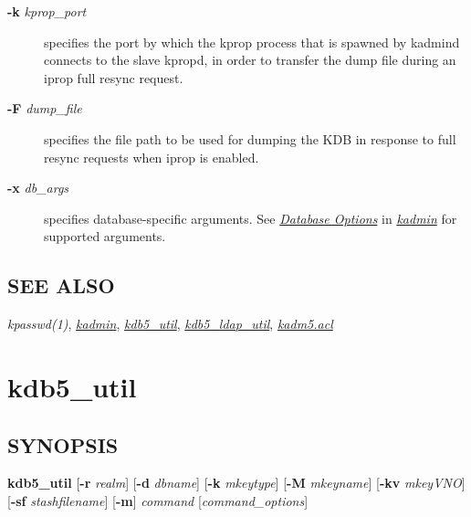 \documentclass[letterpaper,10pt,english]{sphinxmanual}
\begin{document}
\begin{description}
\item[{\textbf{-k} \emph{kprop\_port}}] \leavevmode
specifies the port by which the kprop process that is spawned by kadmind
connects to the slave kpropd, in order to transfer the dump file during
an iprop full resync request.

\item[{\textbf{-F} \emph{dump\_file}}] \leavevmode
specifies the file path to be used for dumping the KDB in response
to full resync requests when iprop is enabled.

\item[{\textbf{-x} \emph{db\_args}}] \leavevmode
specifies database-specific arguments.  See {\hyperref[admin/admin_commands/kadmin_local:dboptions]{\emph{Database Options}}} in {\hyperref[admin/admin_commands/kadmin_local:kadmin-1]{\emph{kadmin}}} for supported arguments.

\end{description}


\subsection{SEE ALSO}
\label{admin/admin_commands/kadmind:see-also}
\emph{kpasswd(1)}, {\hyperref[admin/admin_commands/kadmin_local:kadmin-1]{\emph{kadmin}}}, {\hyperref[admin/admin_commands/kdb5_util:kdb5-util-8]{\emph{kdb5\_util}}},
{\hyperref[admin/admin_commands/kdb5_ldap_util:kdb5-ldap-util-8]{\emph{kdb5\_ldap\_util}}}, {\hyperref[admin/conf_files/kadm5_acl:kadm5-acl-5]{\emph{kadm5.acl}}}


\section{kdb5\_util}
\label{admin/admin_commands/kdb5_util:kdb5-util-8}\label{admin/admin_commands/kdb5_util::doc}\label{admin/admin_commands/kdb5_util:kdb5-util}

\subsection{SYNOPSIS}
\label{admin/admin_commands/kdb5_util:synopsis}\label{admin/admin_commands/kdb5_util:kdb5-util-synopsis}
\textbf{kdb5\_util}
{[}\textbf{-r} \emph{realm}{]}
{[}\textbf{-d} \emph{dbname}{]}
{[}\textbf{-k} \emph{mkeytype}{]}
{[}\textbf{-M} \emph{mkeyname}{]}
{[}\textbf{-kv} \emph{mkeyVNO}{]}
{[}\textbf{-sf} \emph{stashfilename}{]}
{[}\textbf{-m}{]}
\emph{command} {[}\emph{command\_options}{]}
\end{document}
